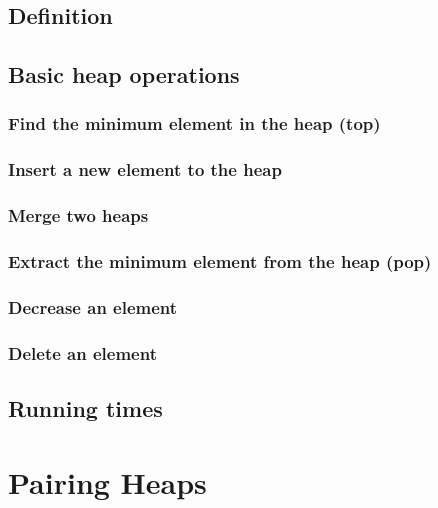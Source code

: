 \documentclass{article}
\begin{document}
\subsection{Definition}

\subsection{Basic heap operations}

\subsubsection{Find the minimum element in the heap (top)}

\subsubsection{Insert a new element to the heap}

\subsubsection{Merge two heaps}

\subsubsection{Extract the minimum element from the heap (pop)}

\subsubsection{Decrease an element}

\subsubsection{Delete an element}

\subsection{Running times}



\section{Pairing Heaps}
\label{pairing-heap}
\end{document}
